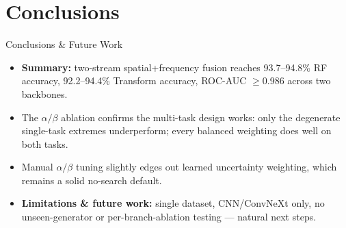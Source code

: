 \section{Conclusions}

\begin{frame}{Conclusions \& Future Work}
  \footnotesize
  \begin{itemize}
    \item \textbf{Summary:} two-stream spatial+frequency fusion reaches 93.7--94.8\% RF accuracy, 92.2--94.4\% Transform accuracy, ROC-AUC $\geq$0.986 across two backbones.
    \item The $\alpha/\beta$ ablation confirms the multi-task design works: only the degenerate single-task extremes underperform; every balanced weighting does well on both tasks.
    \item Manual $\alpha/\beta$ tuning slightly edges out learned uncertainty weighting, which remains a solid no-search default.
    \item \textbf{Limitations \& future work:} single dataset, CNN/ConvNeXt only, no unseen-generator or per-branch-ablation testing — natural next steps.
  \end{itemize}
\end{frame}

